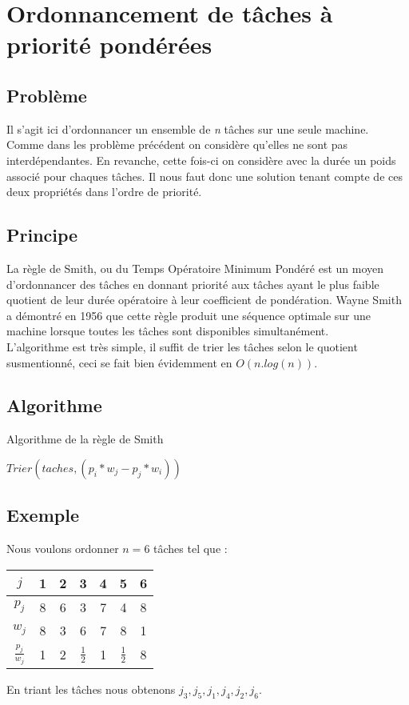 \section{Ordonnancement de tâches à priorité pondérées}
\subsection{Problème}
Il s'agit ici d'ordonnancer un ensemble de {\em n} tâches sur une seule machine.
Comme dans les problème précédent on considère qu'elles ne sont pas
interdépendantes. En revanche, cette fois-ci on considère avec la durée un poids
associé pour chaques tâches. Il nous faut donc une solution tenant compte de ces
deux propriétés dans l'ordre de priorité. 
 
\subsection{Principe}
La règle de Smith, ou du Temps Opératoire Minimum Pondéré est un moyen 
d'ordonnancer des tâches en donnant priorité aux tâches ayant le plus faible 
quotient de leur durée opératoire à leur coefficient de pondération. Wayne Smith 
a démontré en 1956 que cette règle produit une séquence optimale sur une machine 
lorsque toutes les tâches sont disponibles simultanément.\\
L'algorithme est très simple, il suffit de trier les tâches selon le quotient 
susmentionné, ceci se fait bien évidemment en $O(n.log(n))$.

\subsection{Algorithme}
\begin{algorithm}
\caption{Algorithme de la règle de Smith}
\begin{algorithmic}
\STATE $Trier(taches, (p_i*w_j - p_j*w_i))$
\end{algorithmic}
\end{algorithm}

\subsection{Exemple}
Nous voulons ordonner $n = 6$ tâches tel que :
\begin{center}
\begin{tabular}{|c|c|c|c|c|c|c|}
\hline
$j$ & 1 & 2 & 3 & 4 & 5 & 6  \\
\hline
$p_j$ & 8 & 6 & 3 & 7 & 4 & 8  \\
$w_j$ & 8 & 3 & 6 & 7 & 8 & 1  \\
\hline
$\frac{p_j}{w_j}$ & 1 & 2 & $\frac{1}{2}$ & 1 & $\frac{1}{2}$ & 8 \\
\hline
\end{tabular}
\end{center}
En triant les tâches nous obtenons $j_3,j_5,j_1,j_4,j_2,j_6$.

